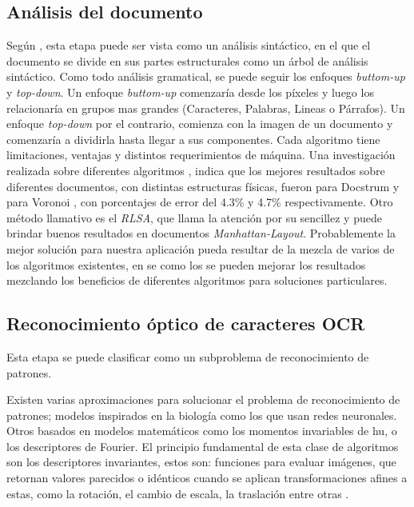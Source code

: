 \documentclass{article}
\begin{document}
	\subsection{Análisis del documento}
	Según \cite{doc_analysis2}, esta etapa puede ser vista como un análisis sintáctico,
	en el que el documento se divide en sus partes estructurales como un árbol de análisis
	sintáctico. Como todo análisis gramatical, se puede seguir los enfoques
	\textit{buttom-up} y \textit{top-down}. Un enfoque \textit{buttom-up} comenzaría desde
	los píxeles y luego los relacionaría en grupos mas grandes (Caracteres, Palabras, Lineas
	o Párrafos). Un enfoque \textit{top-down} por el contrario, comienza con la imagen de un
	documento y comenzaría a dividirla hasta llegar a sus componentes.
	Cada algoritmo tiene limitaciones, ventajas y distintos requerimientos de máquina.
	Una investigación realizada sobre diferentes algoritmos \cite{benchmark1}, indica que los
	mejores resultados sobre diferentes documentos, con distintas estructuras físicas,
	fueron para Docstrum \cite{docstrum93} y para Voronoi \cite{voronoi1}, con porcentajes
	de error del 4.3\% y 4.7\% respectivamente. Otro método
	llamativo es el \textit{RLSA}, que llama la atención por su sencillez y puede brindar
	buenos resultados en documentos \textit{Manhattan-Layout}\cite{RLSA1}.
	Probablemente la mejor solución para nuestra aplicación pueda resultar de la mezcla de
	varios de los algoritmos existentes, en \cite{voronoi2} se como los se pueden mejorar
	los resultados mezclando los beneficios de diferentes algoritmos para soluciones
	particulares.
	
	\subsection{Reconocimiento óptico de caracteres OCR}
	Esta etapa se puede clasificar como un subproblema de reconocimiento de patrones.
	
	Existen varias aproximaciones para solucionar el problema de reconocimiento de patrones; 
	modelos inspirados en la biología como los que usan redes neuronales\cite{im_biology}. Otros
	basados en modelos matemáticos como los momentos invariables de hu\cite{art_hu}, o los
	descriptores de Fourier. El principio fundamental de esta clase de algoritmos son
	los descriptores invariantes, estos son: funciones para evaluar imágenes, que retornan valores 
	parecidos o idénticos cuando se aplican	transformaciones afines a estas, como la rotación,
	el cambio de escala, la traslación entre otras \cite{ocrs1}.
	
\end{document}
